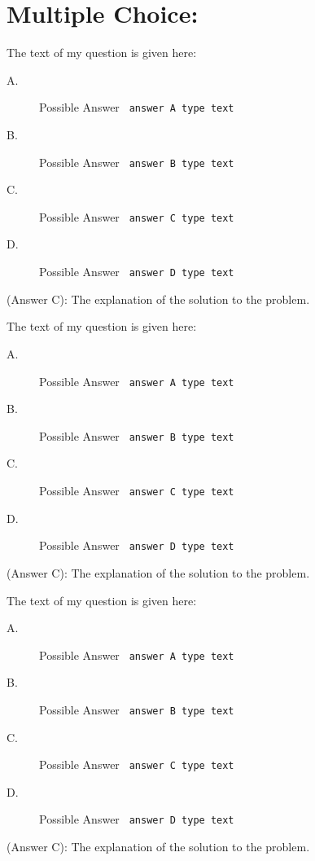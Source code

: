 \documentclass[12pt,answers]{exam}
\begin{document}
\section*{Multiple Choice:}
\begin{questions}
\question The text of my question is given here:
\begin{description}
\item[A.] Possible Answer \verb' answer A type text'
\item[B.] Possible Answer \verb' answer B type text'
\item[C.] Possible Answer \verb' answer C type text'   
\item[D.] Possible Answer \verb' answer D type text'     
\end{description}
\begin{solution}
(Answer C): The explanation of the solution to the problem.  
\end{solution}

\question The text of my question is given here:
\begin{description}
\item[A.] Possible Answer \verb' answer A type text'
\item[B.] Possible Answer \verb' answer B type text'
\item[C.] Possible Answer \verb' answer C type text'    
\item[D.] Possible Answer \verb' answer D type text'     
\end{description}
\begin{solution}
(Answer C): The explanation of the solution to the problem.  
\end{solution}

\question The text of my question is given here:
\begin{description}
\item[A.] Possible Answer \verb' answer A type text'
\item[B.] Possible Answer \verb' answer B type text'
\item[C.] Possible Answer \verb' answer C type text'   
\item[D.] Possible Answer \verb' answer D type text'     
\end{description}
\begin{solution}
(Answer C): The explanation of the solution to the problem.  
\end{solution}


\end{questions}
\end{document}
